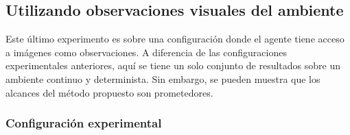 \subsection{Utilizando observaciones visuales del ambiente}

Este último experimento es sobre una configuración donde el agente 
tiene acceso a imágenes como observaciones. A diferencia de las
configuraciones experimentales anteriores, aquí se tiene un solo conjunto
de resultados sobre un ambiente continuo y determinista. Sin embargo, 
se pueden muestra que los alcances del método propuesto son prometedores.

\subsubsection{Configuración experimental}

